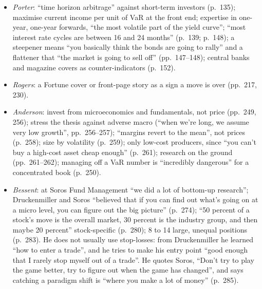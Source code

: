 \begin{qfmethod}
\begin{itemize}
\emph{Stops} (pp.~131--132): after a stop on a single trade you may get back in, ``but with a very tight stop'', counting the loss already taken, so the risk/reward, which ``should at least be 4 to 1 in any given trade'', is worse the second time; after hitting the 1 ``a couple of times'' a 4:1 trade has become 4:3 and you should move on. Asked about a cooling-off period, he answers ``On a specific trade, no''; only ``On a portfolio level, if you get stopped out of all positions due to a bad run'', after big losses, should managers ``get away from the markets for about a month''; he also recommends three to four weeks away once a year. \emph{Wadhwani}: positioning matters more than the macro news (p.~163); never ignore a stop, and take a 24-hour break before re-entering (p.~177).
\item \emph{Porter}: ``time horizon arbitrage'' against short-term investors (p.~135); maximise current income per unit of VaR at the front end; expertise in one-year, one-year forwards, ``the most volatile part of the yield curve''; ``most interest rate cycles are between 16 and 24 months'' (p.~139; p.~148); a steepener means ``you basically think the bonds are going to rally'' and a flattener that ``the market is going to sell off'' (pp.~147--148); central banks and magazine covers as counter-indicators (p.~152).
\item \emph{Rogers}: a Fortune cover or front-page story as a sign a move is over (pp.~217, 230).
\item \emph{Anderson}: invest from microeconomics and fundamentals, not price (pp.~249, 256); stress the thesis against adverse macro (``when we're long, we assume very low growth'', pp.~256--257); ``margins revert to the mean'', not prices (p.~258); size by volatility (p.~259); only low-cost producers, since ``you can't buy a high-cost asset cheap enough'' (p.~261); research on the ground (pp.~261--262); managing off a VaR number is ``incredibly dangerous'' for a concentrated book (p.~250).
\item \emph{Bessent}: at Soros Fund Management ``we did a lot of bottom-up research''; Druckenmiller and Soros ``believed that if you can find out what's going on at a micro level, you can figure out the big picture'' (p.~274); ``50 percent of a stock's move is the overall market, 30 percent is the industry group, and then maybe 20 percent'' stock-specific (p.~280); 8 to 14 large, unequal positions (p.~283). He does not usually use stop-losses: from Druckenmiller he learned ``how to enter a trade'', and he tries to make his entry point ``good enough that I rarely stop myself out of a trade''. He quotes Soros, ``Don't try to play the game better, try to figure out when the game has changed'', and says catching a paradigm shift is ``where you make a lot of money'' (p.~285).

\end{itemize}
\end{qfmethod}
